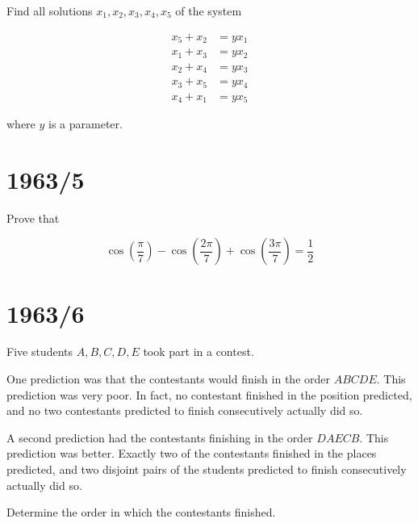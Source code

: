 \documentclass[12pt]{article}
\begin{document}
Find all solutions \( x_1, x_2, x_3, x_4, x_5 \) of the system

\[
\begin{aligned}
x_5 + x_2 &= yx_1 \\
x_1 + x_3 &= yx_2 \\
x_2 + x_4 &= yx_3 \\
x_3 + x_5 &= yx_4 \\
x_4 + x_1 &= yx_5
\end{aligned}
\]

where \( y \) is a parameter.

\section*{1963/5}

Prove that

\[
\cos\left(\frac{\pi}{7}\right)
-
\cos\left(\frac{2\pi}{7}\right)
+
\cos\left(\frac{3\pi}{7}\right)
=
\frac{1}{2}
\]

\section*{1963/6}

Five students \( A, B, C, D, E \) took part in a contest.

One prediction was that the contestants would finish in the order \( ABCDE \). This prediction was very poor. In fact, no contestant finished in the position predicted, and no two contestants predicted to finish consecutively actually did so.

A second prediction had the contestants finishing in the order \( DAECB \). This prediction was better. Exactly two of the contestants finished in the places predicted, and two disjoint pairs of the students predicted to finish consecutively actually did so.

Determine the order in which the contestants finished.
\end{document}
